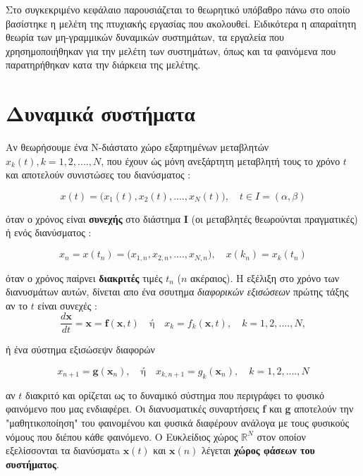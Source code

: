 Στο συγκεκριμένο κεφάλαιο παρουσιάζεται το θεωρητικό υπόβαθρο πάνω στο οποίο βασίστηκε η μελέτη της πτυχιακής εργασίας που ακολουθεί.
Ειδικότερα η απαραίτητη θεωρία των μη-γραμμικών δυναμικών συστημάτων, τα εργαλεία που χρησημοποιήθηκαν για την μελέτη των συστημάτων, όπως και τα φαινόμενα που παρατηρήθηκαν κατα την διάρκεια της μελέτης.

\section{Δυναμικά συστήματα}

	
Αν θεωρήσουμε ένα Ν-διάστατο χώρο εξαρτημένων μεταβλητών $x_k(t), k =1, 2, ...., N$, που έχουν ώς μόνη ανεξάρτητη μεταβλητή τους το χρόνο  $t$ και αποτελούν συνιστώσες του διανύσματος :

\begin{equation}	
	x (t)= \bigl( x_1(t) , x_2(t), .... , x_N(t) \bigl) ,\quad t \in I= (α,β)
	\label{m:g1}
\end{equation}

όταν ο χρόνος είναι \textbf{συνεχής} στο διάστημα \textbf{I} (οι μεταβλητές θεωρούνται πραγματικές) ή ενός διανύσματος :

\begin{equation}	
x_n = x(t_n)= \bigl( x_{1,n}, x_{2,n}, .... , x_{N,n} \bigl) , \quad x(k_n)= x_k(t_n)
\label{m:g2}
\end{equation}

όταν ο χρόνος παίρνει \textbf{διακριτές} τιμές $t_n$ ($n$ ακέραιος).
Η εξέλιξη στο χρόνο των διανυσμάτων αυτών, δίνεται απο ένα σσυτημα 
\emph{διαφορικών εξισώσεων} πρώτης τάξης αν το $t$ είναι συνεχές :
\begin{equation}
	\frac{d\textbf{x}}{dt} = \textbf{x} = \textbf{f}(\textbf{x},t)  \quad  \text{ή} \quad  
		  x_k = f_k (\textbf{x},t), \quad k=1,2, .... , N ,
	\label{m:g3}
\end{equation}

ή ένα σύστημα εξισώσεψν διαφορών

\begin{equation}	
	x_{n+1} = \textbf{g}(\textbf{x}_n), \quad \text{ή}  \quad x_{k,n+1}= g_k(\textbf{x}_n), \quad k=1,2, .... , N
	\label{m:g4}
\end{equation}

αν $t$ διακριτό και ορίζεται ως το δυναμικό σύστημα που περιγράφει το φυσικό φαινόμενο που μας ενδιαφέρει. Οι διανυσματικές συναρτήσεις \textbf{f} και \textbf{g} αποτελούν την "μαθητικοποίηση"
του φαινομένου και φυσικά διαφέρουν ανάλογα με τους φυσικούς νόμους που διέπου κάθε φαινόμενο. Ο Ευκλείδιος χώρος $ \mathbb{R} ^Ν$ στον οποίον εξελίσσονται τα διανύσματa $\textbf{x}(t)$ και $\textbf{x}(n)$ λέγεται \textbf{χώρος φάσεων του συστήματος}.\cite{b1}

